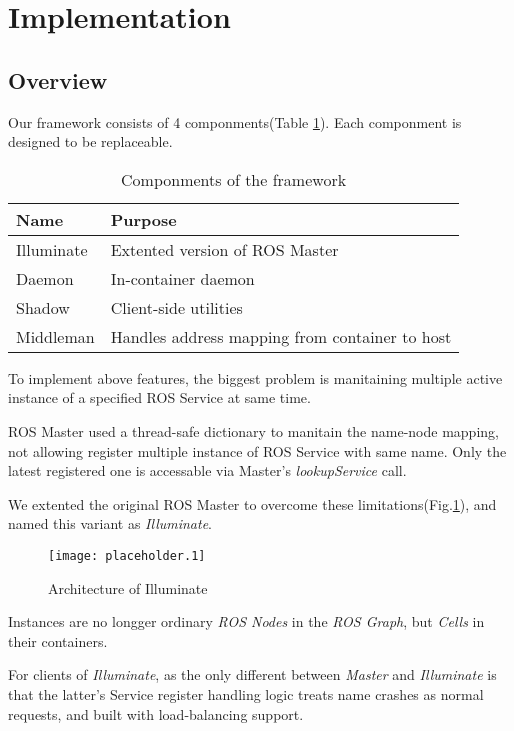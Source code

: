 \section{Implementation}

\subsection{Overview}

Our framework consists of 4 componments(Table \ref{table:componments}).
Each componment is designed to be replaceable.

\begin{table}[H]
  \renewcommand{\arraystretch}{1.3}
  \caption{Componments of the framework}
  \label{table:componments}
  \centering
  \begin{tabular}{ll}
     \hline
     \bfseries Name & \bfseries Purpose \\
     \hline
     Illuminate & Extented version of ROS Master \\ 
     Daemon     & In-container daemon \\
     Shadow     & Client-side utilities \\
     Middleman  & Handles address mapping from container to host \\
     \hline
  \end{tabular}
\end{table} 

To implement above features, the biggest problem is manitaining multiple active
instance of a specified ROS Service at same time.

ROS Master used a thread-safe dictionary to manitain the name-node mapping,
not allowing register multiple instance of ROS Service with same name.
Only the latest registered one is accessable via Master's \emph{lookupService} call.

We extented the original ROS Master to overcome these limitations(Fig.\ref{figure:illuminate}),
and named this variant as \emph{Illuminate}.

\begin{figure}[h]
\centering
\texttt{[image: placeholder.1]}
\caption{Architecture of Illuminate}
\label{figure:illuminate}
\end{figure}

Instances are no longger ordinary \emph{ROS Nodes} in the \emph{ROS Graph},
but \emph{Cells} in their containers.

For clients of \emph{Illuminate}, as the only different between \emph{Master} and \emph{Illuminate}
is that the latter's Service register handling logic treats name crashes as normal requests, 
and built with load-balancing support.

